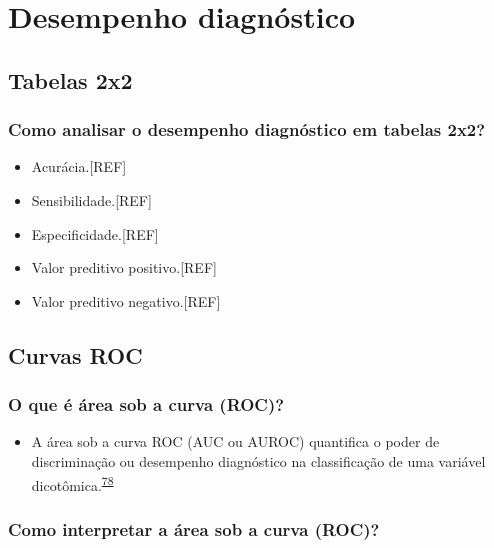 \documentclass[
]{book}
\providecommand{\tightlist}{%
  \setlength{\itemsep}{0pt}\setlength{\parskip}{0pt}}
\begin{document}
\hypertarget{analise-desempenho-diagnostico}{%
\chapter{\texorpdfstring{\textbf{Desempenho diagnóstico}}{Desempenho diagnóstico}}\label{analise-desempenho-diagnostico}}

\hypertarget{tabelas-2x2}{%
\section{Tabelas 2x2}\label{tabelas-2x2}}

\hypertarget{como-analisar-o-desempenho-diagnuxf3stico-em-tabelas-2x2}{%
\subsection{Como analisar o desempenho diagnóstico em tabelas 2x2?}\label{como-analisar-o-desempenho-diagnuxf3stico-em-tabelas-2x2}}

\begin{itemize}
\item
  Acurácia.{[}REF{]}
\item
  Sensibilidade.{[}REF{]}
\item
  Especificidade.{[}REF{]}
\item
  Valor preditivo positivo.{[}REF{]}
\item
  Valor preditivo negativo.{[}REF{]}
\end{itemize}

\hypertarget{curvas-roc}{%
\section{Curvas ROC}\label{curvas-roc}}

\hypertarget{o-que-uxe9-uxe1rea-sob-a-curva-roc}{%
\subsection{O que é área sob a curva (ROC)?}\label{o-que-uxe9-uxe1rea-sob-a-curva-roc}}

\begin{itemize}
\tightlist
\item
  A área sob a curva ROC (AUC ou AUROC) quantifica o poder de discriminação ou desempenho diagnóstico na classificação de uma variável dicotômica.\textsuperscript{\protect\hyperlink{ref-de2022}{78}}
\end{itemize}

\hypertarget{como-interpretar-a-uxe1rea-sob-a-curva-roc}{%
\subsection{Como interpretar a área sob a curva (ROC)?}\label{como-interpretar-a-uxe1rea-sob-a-curva-roc}}
\end{document}
